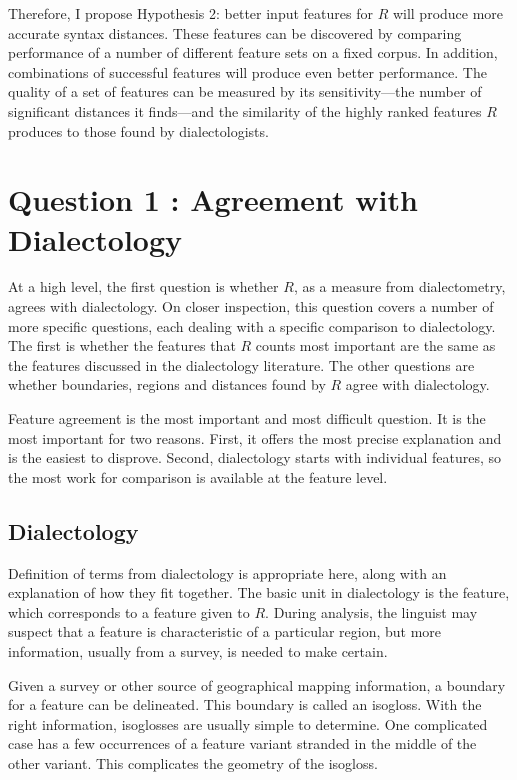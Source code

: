 Therefore, I propose Hypothesis 2: better input features
for $R$ will produce more accurate syntax
distances. These features can be discovered by comparing performance
of a number of different feature sets on a fixed corpus. In addition,
combinations of successful features will produce even better
performance.
The quality of a set of features can be
measured by its sensitivity---the number of significant distances it
finds---and the similarity of the highly ranked features $R$ produces
to those found by dialectologists.

\section{Question 1 : Agreement with Dialectology}

At a high level, the first question is whether $R$, as a measure from
dialectometry, agrees with dialectology. On closer inspection, this
question covers a number of more specific questions, each dealing with
a specific comparison to dialectology. The first is whether the
features that $R$ counts most important are the same as the features
discussed in the dialectology literature. The other questions are
whether boundaries, regions and distances found by $R$ agree with
dialectology.

Feature agreement is the most important and most difficult
question. It is the most important for two reasons. First, it offers
the most precise explanation and is the easiest to disprove.
Second,
dialectology starts with individual features, so the most work for
comparison is available at the feature level.

\subsection{Dialectology}

Definition of terms from dialectology is appropriate here, along with
an explanation of how they fit together. The basic unit in
dialectology is the feature, which corresponds to a feature given to
$R$. During analysis, the linguist may suspect that a feature is
characteristic of a particular region, but more information, usually
from a survey, is needed to make certain.

Given a survey or other source of geographical mapping information, a
boundary for a feature can be delineated. This boundary is called an
isogloss. With the right information, isoglosses are usually simple to
determine. One complicated case has a few occurrences of a feature
variant stranded in the middle of the other variant. This complicates
the geometry of the isogloss.


